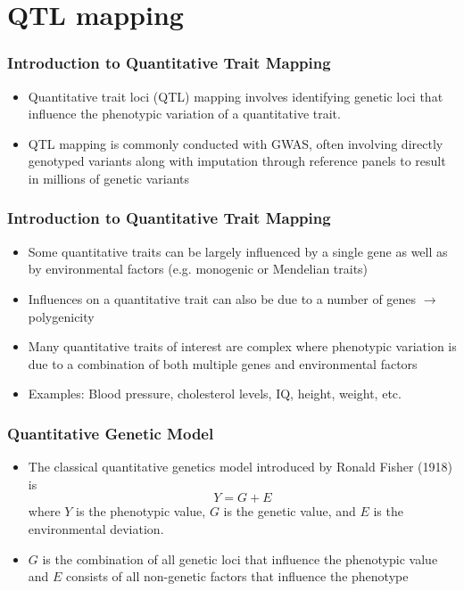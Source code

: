 \documentclass{beamer}
\begin{document}
\section{QTL mapping}


\begin{frame}
	\frametitle{\bf Introduction to Quantitative Trait Mapping}
	\begin{itemize}
		\item Quantitative trait loci (QTL) mapping involves identifying genetic loci that influence the phenotypic variation of a quantitative trait.
		\item QTL mapping is commonly conducted with GWAS, often involving directly genotyped variants along with imputation through reference panels to result in millions of genetic variants
	\end{itemize}
\end{frame}

\begin{frame}
	\frametitle{\bf Introduction to Quantitative Trait Mapping}
	\begin{itemize}
		\item	Some quantitative traits can be largely influenced by a single gene as well as by environmental factors (e.g. monogenic or Mendelian traits)
		\item  Influences on a quantitative trait can also be due to a number of genes  $\rightarrow$ polygenicity
		\item Many quantitative traits of interest are complex where phenotypic variation is due to a combination of both multiple genes and environmental factors
		\item Examples: Blood pressure, cholesterol levels, IQ, height, weight, etc.
	\end{itemize}
\end{frame}


\begin{frame}
	\frametitle{\bf Quantitative Genetic Model}
	\begin{itemize}
		\item The classical quantitative genetics model introduced by Ronald Fisher (1918) is 
		$$Y=G+E $$
		 where $Y$ is the phenotypic value, $G$ is the genetic value, and $E$ is the environmental deviation.
		\item $G$ is the combination of all genetic loci that influence the phenotypic value  and $E$ consists of all non-genetic factors that influence the phenotype
	\end{itemize}
\end{frame}
\end{document}
